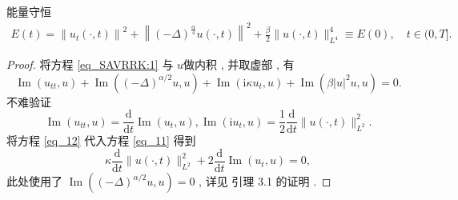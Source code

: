 能量守恒
\begin{align}\label{eq_SAVRRK:9}
	E(t)=\left\|u_{t}(\cdot , t)\right\|^{2}+\left\|(-\Delta)^{\frac{\alpha}{4}} u(\cdot , t)\right\|^{2}+\frac{\beta}{2}\|u(\cdot , t)\|_{L^{4}}^{4} \equiv E(0) , \quad t \in(0 , T] . 
	\end{align}

\begin{proof}
	将方程 \eqref{eq_SAVRRK:1} 与 $u$做内积 , 并取虚部 , 有
\begin{equation}
\operatorname{Im}\left(u_{t t} , u\right)+\operatorname{Im}\left((-\Delta)^{\alpha / 2} u , u\right)+\operatorname{Im}\left(\mathrm{i} \kappa u_{t} , u\right)+\operatorname{Im}\left(\beta|u|^{2} u , u\right)=0  . 
\label{eq_11}\end{equation}
不难验证
\begin{equation}
\operatorname{Im}\left(u_{t t} , u\right)=\frac{\mathrm{d}}{\mathrm{d} t} \operatorname{Im}\left(u_{t} , u\right) , \operatorname{Im}\left(\mathrm{i} u_{t} , u\right)=\frac{1}{2} \frac{\mathrm{d}}{\mathrm{d} t}\|u(\cdot , t)\|_{L^{2}}^{2}  . 
\label{eq_12}\end{equation}
将方程 \eqref{eq_12} 代入方程 \eqref{eq_11} 得到
\begin{equation}
\kappa \frac{\mathrm{d}}{\mathrm{d} t}\|u(\cdot , t)\|_{L^{2}}^{2}+2 \frac{\mathrm{d}}{\mathrm{d} t} \operatorname{Im}\left(u_{t} , u\right)=0 , 
\label{eq_13}\end{equation}
此处使用了 $\operatorname{Im}\left((-\Delta)^{\alpha / 2} u , u\right)=0$ , 
详见 \citep{guoExistenceGlobalSmooth2008} 引理 3.1 的证明 . 


\end{proof}
